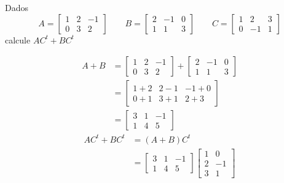 \documentclass[a4paper,12pt,fleqn]{article}
\begin{document}

Dados
\[
  A = \begin{bmatrix}
    1 & 2 & -1 \\
    0 & 3 & 2
  \end{bmatrix}
\qquad
  B = \begin{bmatrix}
    2 & -1 & 0 \\
    1 & 1  & 3
  \end{bmatrix}
\qquad
  C = \begin{bmatrix}
    1 & 2  & 3 \\
    0 & -1 & 1
  \end{bmatrix}
\]
calcule \(AC^t + BC^t\)

\begin{answer}
  \begin{align*}
    A + B
    & =
      \begin{bmatrix}
        1 & 2 & -1 \\
        0 & 3 & 2
      \end{bmatrix}
      +
      \begin{bmatrix}
        2 & -1 & 0 \\
        1 & 1  & 3
      \end{bmatrix}
    \\[2mm]
    & =
      \begin{bmatrix}
        1 + 2 & 2 - 1 & -1 + 0 \\
        0 + 1 & 3 + 1 &  2 + 3
      \end{bmatrix}
    \\[2mm]
    & =
      \begin{bmatrix}
        3 & 1 & -1 \\
        1 & 4 &  5
      \end{bmatrix}
  \end{align*}
  \begin{align*}
    AC^t + BC^t
    & = (A + B)C^t
    \\
    & =
      \begin{bmatrix}
        3 & 1 & -1 \\
        1 & 4 &  5
      \end{bmatrix}
      \begin{bmatrix}
        1 & 0  \\
        2 & -1 \\
        3 & 1
      \end{bmatrix}
    \\[2mm]

\end{align*}
\end{answer}
\end{document}
